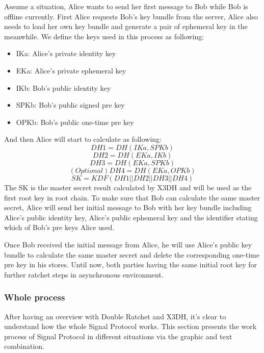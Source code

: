 Assume a situation, Alice wants to send her first message to Bob while Bob is offline currently. First Alice requests Bob's key bundle from the server, Alice also needs to load her own key bundle and generate a pair of ephemeral key in the meanwhile. We define the keys used in this process as following:
\begin{itemize}
\item IKa: Alice's private identity key
\item EKa: Alice's private ephemeral key
\item IKb: Bob's public identity key
\item SPKb: Bob's public signed pre key
\item OPKb: Bob's public one-time pre key
\end{itemize}
And then Alice will start to calculate as following:
\[ DH1=DH(IKa, SPKb) \]
\[ DH2=DH(EKa, IKb) \]
\[ DH3=DH(EKa, SPKb) \]
\[ (Optional) DH4=DH(EKa, OPKb) \]
\[ SK = KDF(DH1 || DH2 || DH3 || DH4) \]
The SK is the master secret result calculated by X3DH and will be used as the first root key in root chain. To make sure that Bob can calculate the same master secret, Alice will send her initial message to Bob with her key bundle including Alice's public identity key, Alice's public ephemeral key and the identifier stating which of Bob's pre keys Alice used.

Once Bob received the initial message from Alice, he will use Alice's public key bundle to calculate the same master secret and delete the corresponding one-time pre key in his stores. Until now, both parties having the same initial root key for further ratchet steps in asynchronous environment.

\subsubsection{Whole process}
After having an overview with Double Ratchet and X3DH, it's clear to understand how the whole Signal Protocol works. This section presents the work process of Signal Protocol in different situations via the graphic and text combination.

